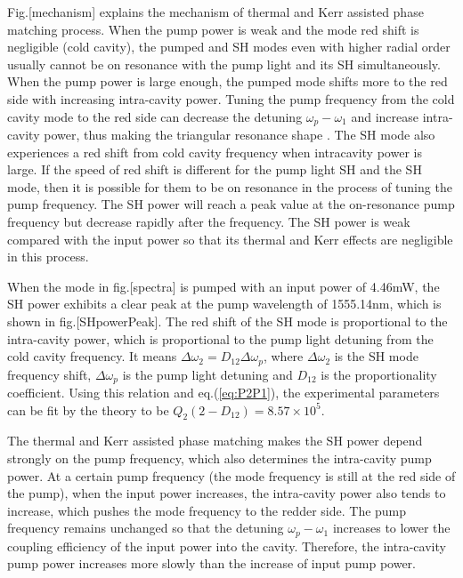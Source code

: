 \documentclass[a4paper,12pt,hyperref]{article}
\begin{document}
Fig.[mechanism] explains the mechanism of thermal and Kerr assisted phase matching process. When the pump power is weak and the mode red shift is negligible (cold cavity), the pumped and SH modes even with higher radial order usually cannot be on resonance with the pump light and its SH simultaneously. When the pump power is large enough, the pumped mode shifts more to the red side with increasing intra-cavity power. Tuning the pump frequency from the cold cavity mode to the red side can decrease the detuning $\omega_p-\omega_1$ and increase intra-cavity power, thus making the triangular resonance shape \cite{carmon2004dynamical}. The SH mode also experiences a red shift from cold cavity frequency when intracavity power is large. If the speed of red shift is different for the pump light SH and the SH mode, then it is possible for them to be on resonance in the process of tuning the pump frequency. The SH power will reach a peak value at the on-resonance pump frequency but decrease rapidly after the frequency. The SH power is weak compared with the input power so that its thermal and Kerr effects are negligible in this process.

When the mode in fig.[spectra] is pumped with an input power of 4.46mW, the SH power exhibits a clear peak at the pump wavelength of 1555.14nm, which is shown in fig.[SHpowerPeak]. The red shift of the SH mode is proportional to the intra-cavity power, which is proportional to the pump light detuning from the cold cavity frequency. It means $\Delta \omega_2 = D_{12}\Delta \omega_p$, where $\Delta \omega_2$ is the SH mode frequency shift, $\Delta \omega_p$ is the pump light detuning and $D_{12}$ is the proportionality coefficient.  Using this relation and eq.(\ref{eq:P2P1}), the experimental parameters can be fit by the theory to be $Q_2(2-D_{12})=8.57\times 10^5$.

The thermal and Kerr assisted phase matching makes the SH power depend strongly on the pump frequency, which also determines the intra-cavity pump power. At a certain pump frequency (the mode frequency is still at the red side of the pump), when the input power increases, the intra-cavity power also tends to increase, which pushes the mode frequency to the redder side. The pump frequency remains unchanged so that the detuning $\omega_p-\omega_1$ increases to lower the coupling efficiency of the input power into the cavity. Therefore, the intra-cavity pump power increases more slowly than the increase of input pump power. 
\end{document}
